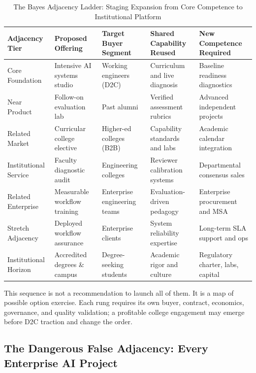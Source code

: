 \begin{table}[t]
\centering
\small
\caption{The Bayes Adjacency Ladder: Staging Expansion from Core Competence to Institutional Platform}
\label{tab:bayes_adjacency_ladder}
\begin{tabularx}{\textwidth}{l p{3.2cm} p{3.2cm} p{3cm} X}
\toprule
\textbf{Adjacency Tier} & \textbf{Proposed Offering} & \textbf{Target Buyer Segment} & \textbf{Shared Capability Reused} & \textbf{New Competence Required} \\
\midrule
Core Foundation & Intensive AI systems studio & Working engineers (D2C) & Curriculum and live diagnosis & Baseline readiness diagnostics \\
\addlinespace[2pt]
Near Product & Follow-on evaluation lab & Past alumni & Verified assessment rubrics & Advanced independent projects \\
\addlinespace[2pt]
Related Market & Curricular college elective & Higher-ed colleges (B2B) & Capability standards and labs & Academic calendar integration \\
\addlinespace[2pt]
Institutional Service & Faculty diagnostic audit & Engineering colleges & Reviewer calibration systems & Departmental consensus sales \\
\addlinespace[2pt]
Related Enterprise & Measurable workflow training & Enterprise engineering teams & Evaluation-driven pedagogy & Enterprise procurement and MSA \\
\addlinespace[2pt]
Stretch Adjacency & Deployed workflow assurance & Enterprise clients & System reliability expertise & Long-term SLA support and ops \\
\addlinespace[2pt]
Institutional Horizon & Accredited degrees \& campus & Degree-seeking students & Academic rigor and culture & Regulatory charter, labs, capital \\
\bottomrule
\end{tabularx}
\end{table}

This sequence is not a recommendation to launch all of them. It is a map of possible option exercise. Each rung requires its own buyer, contract, economics, governance, and quality validation; a profitable college engagement may emerge before D2C traction and change the order.

\subsection{The Dangerous False Adjacency: Every Enterprise AI Project}
\label{sec:dangerous_false_adjacency_enterprise_ai}

